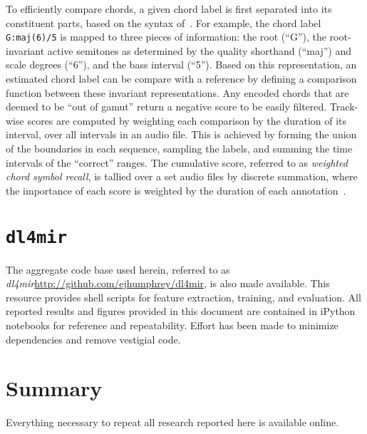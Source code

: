 To efficiently compare chords, a given chord label is first separated into its
constituent parts, based on the syntax of~\cite{harte2010towards}.
For example, the chord label \texttt{G:maj(6)/5} is mapped to three pieces of information: the root (``G''), the root-invariant active semitones as determined by the quality shorthand (``maj'') and scale degrees (``6''), and the bass interval (``5'').
Based on this representation, an estimated chord label can be compare with a reference by defining a comparison function between these invariant representations.
Any encoded chords that are deemed to be ``out of gamut'' return a negative score to be easily filtered.
Track-wise scores are computed by weighting each comparison by the duration of its interval, over all intervals in an audio file.
This is achieved by forming the union of the boundaries in each sequence, sampling the labels, and summing the time intervals of the ``correct'' ranges.
The cumulative score, referred to as \emph{weighted chord symbol recall}, is tallied over a set audio files by discrete summation, where the importance of each score is weighted by the duration of each annotation~\cite{cho2013mirex}.


\section{\texttt{dl4mir}}
\label{sec:dl4mir}

The aggregate code base used herein, referred to as \emph{dl4mir}\url{http://github.com/ejhumphrey/dl4mir}, is also made available.
This resource provides shell scripts for feature extraction, training, and evaluation.
All reported results and figures provided in this document are contained in iPython notebooks for reference and repeatability.
Effort has been made to minimize dependencies and remove vestigial code.


\section{Summary}
\label{sec:summary}

Everything necessary to repeat all research reported here is available online.
